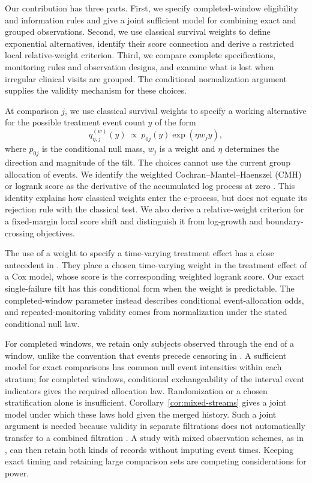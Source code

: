 \documentclass[12pt]{article}
\theoremstyle{definition}
\theoremstyle{remark}
\begin{document}
Our contribution has three parts. First, we specify completed-window eligibility and information rules and give a joint sufficient model for combining exact and grouped observations. Second, we use classical survival weights to define exponential alternatives, identify their score connection and derive a restricted local relative-weight criterion. Third, we compare complete specifications, monitoring rules and observation designs, and examine what is lost when irregular clinical visits are grouped. The conditional normalization argument supplies the validity mechanism for these choices.

At comparison $j$, we use classical survival weights to specify a working alternative for the possible treatment event count $y$ of the form
\[
 q_{\eta,j}^{(w)}(y)\ \propto\ p_{0j}(y)\exp(\eta w_jy),
\]
where $p_{0j}$ is the conditional null mass, $w_j$ is a weight and $\eta$ determines the direction and magnitude of the tilt. The choices cannot use the current group allocation of events. We identify the weighted Cochran--Mantel--Haenszel (CMH) or logrank score as the derivative of the accumulated log process at zero \citep{Cochran1954,MantelHaenszel1959}. This identity explains how classical weights enter the e-process, but does not equate its rejection rule with the classical test. We also derive a relative-weight criterion for a fixed-margin local score shift and distinguish it from log-growth and boundary-crossing objectives.

The use of a weight to specify a time-varying treatment effect has a close antecedent in \citet{LinLeon2017}. They place a chosen time-varying weight in the treatment effect of a Cox model, whose score is the corresponding weighted logrank score. Our exact single-failure tilt has this conditional form when the weight is predictable. The completed-window parameter instead describes conditional event-allocation odds, and repeated-monitoring validity comes from normalization under the stated conditional null law.

For completed windows, we retain only subjects observed through the end of a window, unlike the convention that events precede censoring in \citet[Section~3.3]{TerSchureEtAl2024}. A sufficient model for exact comparisons has common null event intensities within each stratum; for completed windows, conditional exchangeability of the interval event indicators gives the required allocation law. Randomization or a chosen stratification alone is insufficient. Corollary~\ref{cor:mixed-streams} gives a joint model under which these laws hold given the merged history. Such a joint argument is needed because validity in separate filtrations does not automatically transfer to a combined filtration \citep{ChoeRamdas2026}. A study with mixed observation schemes, as in \citet{ZhaoEtAl2008}, can then retain both kinds of records without imputing event times. Keeping exact timing and retaining large comparison sets are competing considerations for power.
\end{document}
